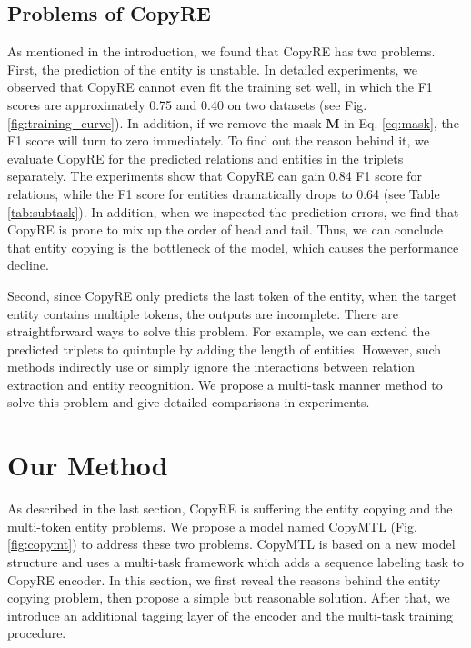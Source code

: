 \documentclass[letterpaper]{article} \usepackage{aaai20}  \usepackage{times}  \usepackage{helvet} \usepackage{courier}  \usepackage[hyphens]{url}  \usepackage{graphicx}
\begin{document}
      \subsection{Problems of CopyRE}
      \label{sec:problem}
      
As mentioned in the introduction, we found that CopyRE has two problems.    
      First, the prediction of the entity is unstable. 
      In detailed experiments, we observed that CopyRE cannot even fit the training set well, in which the F1 scores are approximately {0.75} and {0.40} on two datasets (see Fig. \ref{fig:training_curve}). 
      In addition, if we remove the mask $\bm{M}$ in Eq. \eqref{eq:mask}, the F1 score will turn to zero immediately. 
      To find out the reason behind it, we evaluate CopyRE for the predicted relations and entities in the triplets separately.
      The experiments show that CopyRE can gain {0.84} F1 score for relations, while the F1 score for entities dramatically drops to {0.64} (see Table \ref{tab:subtask}). 
      In addition, when we inspected the prediction errors, we find that CopyRE is prone to mix up the order of head and tail.
      Thus, we can conclude that entity copying is the bottleneck of the model, which causes the performance decline.


      Second, since CopyRE only predicts the last token of the entity, when the target entity contains multiple tokens, the outputs are incomplete. 
      There are straightforward ways to solve this problem. 
      For example, we can extend the predicted triplets to quintuple by adding the length of entities.
      However, such methods indirectly use or simply ignore the interactions between relation extraction and entity recognition. 
      We propose a multi-task manner method to solve this problem and give detailed comparisons in experiments.


  
  \section{Our Method}
  

  As described in the last section, CopyRE is suffering the entity copying and the multi-token entity problems. 
  We propose a model named CopyMTL (Fig. \ref{fig:copymt}) to address these two problems.
  CopyMTL is based on a new model structure and uses a multi-task framework which adds a sequence labeling task to CopyRE encoder.
  In this section, we first reveal the reasons behind the entity copying problem, then propose a simple but reasonable solution.
  After that, we introduce an additional tagging layer of the encoder and the multi-task training procedure.
  
\end{document}
